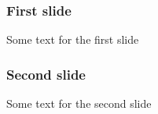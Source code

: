 \documentclass{beamer}
\begin{document}
    \begin{frame}
        \frametitle{First slide}
        Some text for the first slide
    \end{frame}
    \begin{frame}
        \frametitle{Second slide}
        Some text for the second slide
    \end{frame}
\end{document}
